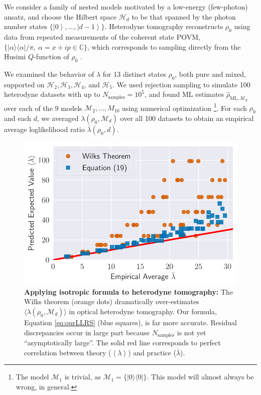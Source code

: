 \documentclass[aps,pra, twocolumn]{revtex4-1}
\newcommand{\M}{\mathcal{M}}
\newcommand{\ket}[1]{\ensuremath{\left|#1\right\rangle}}
\newcommand{\expect}[1]{\ensuremath{\left\langle#1\right\rangle}}
\newcommand{\rhohat}{\hat{\rho}}
\newcommand{\rhoML}[1]{\rhohat_{\scriptscriptstyle{\mathrm{ML},#1}}}
\begin{document}
We consider a family of nested models motivated by a low-energy (few-photon) ansatz, and choose   
the Hilbert space $\mathcal{H}_d$ to be that spanned by the photon number states $\{\ket{0},\ldots ,\ket{d-1}\}$.
Heterodyne tomography reconstructs $\rho_{0}$ using data from repeated measurements of the 
coherent state POVM, $\{|\alpha\rangle\langle \alpha| /\pi, ~\alpha=x+ip\in \mathbb{C}\}$, which corresponds to sampling directly from the Husimi $Q$-function of $\rho_{0}$ \cite{Husimi1940}.

We examined the behavior of $\lambda$ for 13 distinct states $\rho_{0}$, both pure and mixed, supported on $\mathcal{H}_{2}, \mathcal{H}_{3}, \mathcal{H}
_{4}$, and $\mathcal{H}_{5}$.  We used rejection sampling to simulate 100 heterodyne datasets with up to $N_{\mathrm{samples}}=10^5$, and found ML estimates $\rhoML{\M_{d}}$ over each of the 9 models $\M_2, \ldots, M_{10}$ using numerical optimization \footnote{The model $\M_{1}$ is trivial, as $\M_{1} = \{|0\rangle \langle 0|\}$. This model will almost always be wrong, in general.}.  For each $\rho_{0}$ and each $d$, we averaged $\lambda(\rho_{0}, \M_{d})$ over all 100 datasets to obtain an empirical average loglikelihood ratio $\bar{\lambda}(\rho_0,d)$.

\begin{figure}
 \includegraphics[width=.9\columnwidth]{Images/Figure_11.pdf}
 \caption{\textbf{Applying isotropic formula to heterodyne tomography:} The Wilks theorem (orange dots) dramatically over-estimates $\langle\lambda(\rho_{0}, \M_{d})\rangle$ in optical heterodyne tomography. Our formula, Equation \ref{eq:ourLLRS} (blue squares), is far more accurate. Residual discrepancies occur in large part because $N_{\mathrm{samples}}$ is not yet ``asymptotically large''. The solid red line corresponds to perfect correlation between theory ($\expect{\lambda}$) and practice ($\bar\lambda$).}
 \label{fig:modelcomp}
\end{figure}
\end{document}
